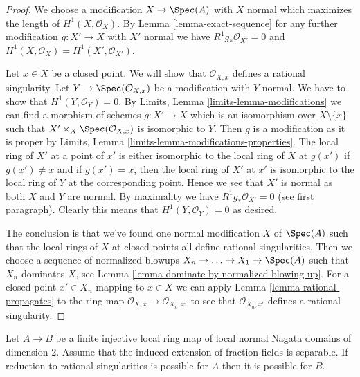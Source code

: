 \begin{proof}
We choose a modification $X \to \Spec(A)$ with $X$ normal
which maximizes the length of $H^1(X, \mathcal{O}_X)$.
By Lemma \ref{lemma-exact-sequence}
for any further modification $g : X' \to X$ with $X'$ normal
we have $R^1g_*\mathcal{O}_{X'} = 0$ and
$H^1(X, \mathcal{O}_X) = H^1(X', \mathcal{O}_{X'})$.

\medskip\noindent
Let $x \in X$ be a closed point. We will show that $\mathcal{O}_{X, x}$
defines a rational singularity. Let $Y \to \Spec(\mathcal{O}_{X, x})$
be a modification with $Y$ normal. We have to show that
$H^1(Y, \mathcal{O}_Y) = 0$. By
Limits, Lemma \ref{limits-lemma-modifications}
we can find a morphism of schemes $g : X' \to X$ which is an isomorphism
over $X \setminus \{x\}$ such that $X' \times_X \Spec(\mathcal{O}_{X, x})$
is isomorphic to $Y$. Then $g$ is a modification as it is proper by
Limits, Lemma \ref{limits-lemma-modifications-properties}.
The local ring of $X'$ at a point of $x'$ is either isomorphic
to the local ring of $X$ at $g(x')$ if $g(x') \not = x$ and
if $g(x') = x$, then the local ring of $X'$ at $x'$ is isomorphic
to the local ring of $Y$ at the corresponding point. Hence we see
that $X'$ is normal as both $X$ and $Y$ are normal. By maximality
we have $R^1g_*\mathcal{O}_{X'} = 0$ (see first paragraph). Clearly
this means that $H^1(Y, \mathcal{O}_Y) = 0$ as desired.

\medskip\noindent
The conclusion is that we've found one normal modification $X$
of $\Spec(A)$ such that the local rings of $X$ at closed points all define
rational singularities. Then we choose a sequence of normalized
blowups $X_n \to \ldots \to X_1 \to \Spec(A)$ such that $X_n$
dominates $X$, see Lemma \ref{lemma-dominate-by-normalized-blowing-up}.
For a closed point $x' \in X_n$ mapping to $x \in X$ we can apply
Lemma \ref{lemma-rational-propagates} to the ring map
$\mathcal{O}_{X, x} \to \mathcal{O}_{X_n, x'}$
to see that $\mathcal{O}_{X_n, x'}$ defines a rational singularity.
\end{proof}

\begin{lemma}
\label{lemma-go-up-separable}
Let $A \to B$ be a finite injective local ring map of local normal
Nagata domains of dimension $2$. Assume that the induced extension of
fraction fields is separable. If reduction to rational singularities
is possible for $A$ then it is possible for $B$.
\end{lemma}

